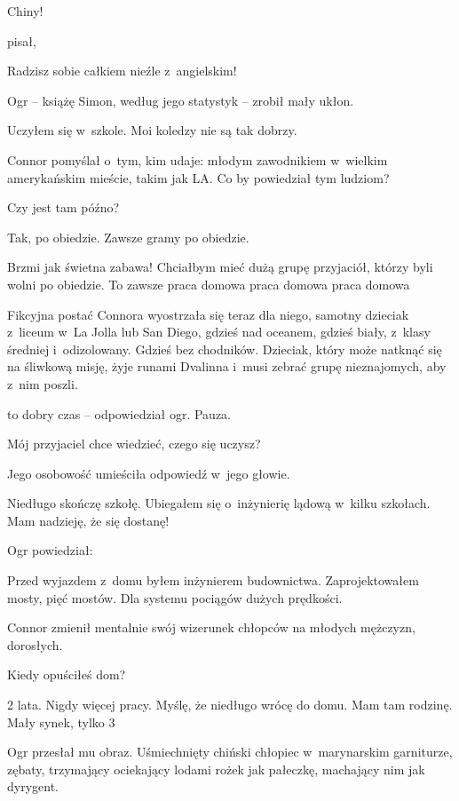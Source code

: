 \documentclass[oneside,polish,11pt,rmheadings]{mwbk}
\begin{document}
\noindent {\textgreater} Chiny!

pisał,

\noindent {\textgreater} Radzisz sobie całkiem nieźle z~angielskim!

Ogr -- książę Simon, według jego statystyk -- zrobił mały ukłon.

\noindent {\textgreater} Uczyłem się w~szkole. Moi koledzy nie są tak dobrzy.

Connor pomyślał o~tym, kim udaje: młodym zawodnikiem w~wielkim amerykańskim mieście, takim jak LA. Co by powiedział tym ludziom?

\noindent {\textgreater} Czy jest tam późno?

\noindent {\textgreater} Tak, po obiedzie. Zawsze gramy po obiedzie.

\noindent {\textgreater} Brzmi jak świetna zabawa! Chciałbym mieć dużą grupę przyjaciół, którzy byli wolni po obiedzie. To zawsze praca domowa praca domowa praca domowa

Fikcyjna postać Connora wyostrzała się teraz dla niego, samotny dzieciak z~liceum w~La Jolla lub San Diego, gdzieś nad oceanem, gdzieś biały, z~klasy średniej i~odizolowany. Gdzieś bez chodników. Dzieciak, który może natknąć się na śliwkową misję, żyje runami Dvalinna i~musi zebrać grupę nieznajomych, aby z~nim poszli.

\noindent {\textgreater} to dobry czas -- odpowiedział ogr. Pauza.

\noindent {\textgreater} Mój przyjaciel chce wiedzieć, czego się uczysz?

Jego osobowość umieściła odpowiedź w~jego głowie.

\noindent {\textgreater} Niedługo skończę szkołę. Ubiegałem się o~inżynierię lądową w~kilku szkołach. Mam nadzieję, że się dostanę!

Ogr powiedział:

\noindent {\textgreater} Przed wyjazdem z~domu byłem inżynierem budownictwa. Zaprojektowałem mosty, pięć mostów. Dla systemu pociągów dużych prędkości.

Connor zmienił mentalnie swój wizerunek chłopców na młodych mężczyzn, dorosłych.

\noindent {\textgreater} Kiedy opuściłeś dom?

\noindent {\textgreater} 2 lata. Nigdy więcej pracy. Myślę, że niedługo wrócę do domu. Mam tam rodzinę. Mały synek, tylko 3

Ogr przesłał mu obraz. Uśmiechnięty chiński chłopiec w~marynarskim garniturze, zębaty, trzymający ociekający lodami rożek jak pałeczkę, machający nim jak dyrygent.
\end{document}
